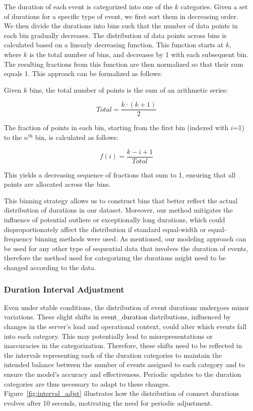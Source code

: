 \documentclass[preprint,12pt]{elsarticle}
\begin{document}
The duration of each event is categorized into one of the $k$ categories. Given a set of durations for a specific type of event, we first sort them in decreasing order. We then divide the durations into bins such that the number of data points in each bin gradually decreases. The distribution of data points across bins is calculated based on a linearly decreasing function. This function starts at $k$, where $k$ is the total number of bins, and decreases by 1 with each subsequent bin. The resulting fractions from this function are then normalized so that their sum equals 1. This approach can be formalized as follows:

Given $k$ bins, the total number of points is the sum of an arithmetic series:

\[
Total = \frac{k \cdot (k + 1)}{2}
\]

The fraction of points in each bin, starting from the first bin (indexed with $i$=1) to the $n^\text{th}$ bin, is calculated as follows:

\[
f(i) = \frac{k - i + 1}{Total}
\]

This yields a decreasing sequence of fractions that sum to 1, ensuring that all points are allocated across the bins.

This binning strategy allows us to construct bins that better reflect the actual distribution of durations in our dataset. Moreover, our method mitigates the influence of potential outliers or exceptionally long durations, which could disproportionately affect the distribution if standard equal-width or equal-frequency binning methods were used. As mentioned, our modeling approach can be used for any other type of sequential data that involves the duration of events, therefore the method used for categorizing the durations might need to be changed according to the data.


\subsubsection{Duration Interval Adjustment}
\label{sec:duration-interval-adjustment}
Even under stable conditions, the distribution of event durations undergoes minor variations. These slight shifts in \textcolor{black}{event\_duration} distributions, influenced by changes in the server's load and operational context, could alter which events fall into each category. This may potentially lead to misrepresentations or inaccuracies in the categorization. Therefore, these shifts need to be reflected in the intervals representing each of the duration categories to maintain the intended balance between the number of events assigned to each category and to ensure the model's accuracy and effectiveness. Periodic updates to the duration categories are thus necessary to adapt to these changes. Figure~\ref{fig:interval_adjst} illustrates how the distribution of connect durations evolves after 10 seconds, motivating the need for periodic adjustment.
\end{document}
